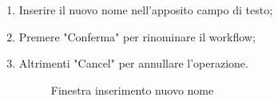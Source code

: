 \begin{enumerate}
	\begin{enumerate}
		\item Inserire il nuovo nome nell'apposito campo di testo;
		\item Premere "Conferma" per rinominare il workflow;
		\item Altrimenti "Cancel" per annullare l'operazione.
		\begin{figure}[!ht]
			\centering
			\caption{Finestra inserimento nuovo nome}
		\end{figure}
	\end{enumerate}
	\begin{figure}[!ht]
		\centering

\end{figure}
\end{enumerate}
